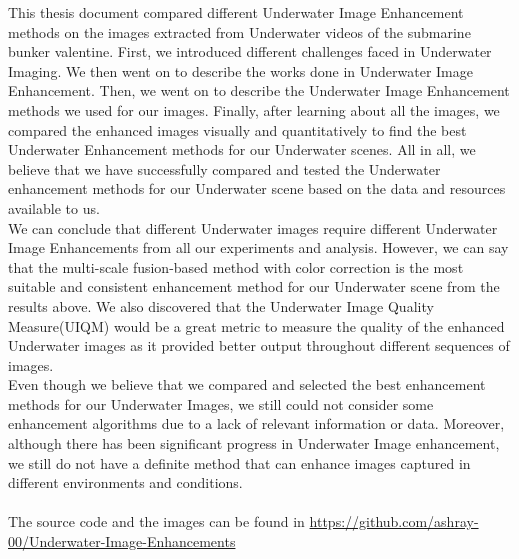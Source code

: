 \documentclass[a4paper,11pt,oneside]{article}
\begin{document}
  This thesis document compared different Underwater Image Enhancement methods on the images extracted from Underwater videos of the submarine bunker valentine. First, we introduced different challenges faced in Underwater Imaging. We then went on to describe the works done in Underwater Image Enhancement. Then, we went on to describe the Underwater Image Enhancement methods we used for our images. Finally, after learning about all the images, we compared the enhanced images visually and quantitatively to find the best Underwater Enhancement methods for our Underwater scenes. All in all, we believe that we have successfully compared and tested the Underwater enhancement methods for our Underwater scene based on the data and resources available to us.\\
We can conclude that different Underwater images require different Underwater Image Enhancements from all our experiments and analysis. However, we can say that the multi-scale fusion-based method with color correction is the most suitable and consistent enhancement method for our Underwater scene from the results above. We also discovered that the Underwater Image Quality Measure(UIQM) would be a great metric to measure the quality of the enhanced Underwater images as it provided better output throughout different sequences of images.\\
Even though we believe that we compared and selected the best enhancement methods for our Underwater Images, we still could not consider some enhancement algorithms due to a lack of relevant information or data. Moreover, although there has been significant progress in Underwater Image enhancement, we still do not have a definite method that can enhance images captured in different environments and conditions.
  \\
  \\
  The source code and the images can be found in \href{https://github.com/ashray-00/Underwater-Image-Enhancements}{https://github.com/ashray-00/Underwater-Image-Enhancements}
  \newpage
  
  \printbibliography
  
\end{document}
